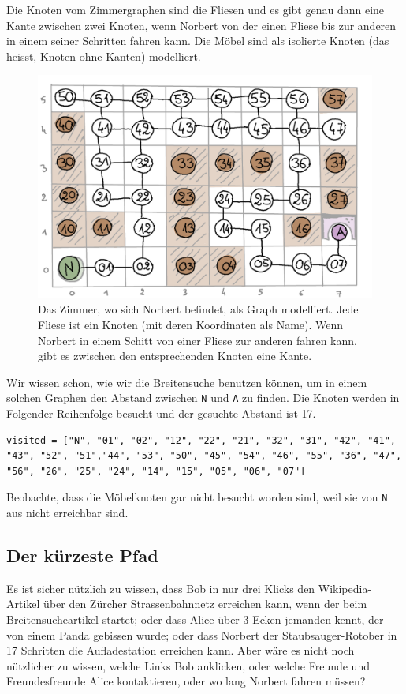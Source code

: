 Die Knoten vom Zimmergraphen sind die Fliesen und es gibt genau dann eine Kante zwischen zwei Knoten, wenn Norbert von der einen Fliese bis zur anderen in einem seiner Schritten fahren kann. Die Möbel sind als isolierte Knoten (das heisst, Knoten ohne Kanten) modelliert.
\begin{figure}[H]
    \centering
    \includegraphics[width=\textwidth]{Pictures/SP/norbert_graph.png}
    \caption{Das Zimmer, wo sich Norbert befindet, als Graph modelliert. Jede Fliese ist ein Knoten (mit deren Koordinaten als Name). Wenn Norbert in einem Schitt von einer Fliese zur anderen fahren kann, gibt es zwischen den entsprechenden Knoten eine Kante.}
    \label{fig:norbert_graph}
\end{figure}
Wir wissen schon, wie wir die Breitensuche benutzen können, um in einem solchen Graphen den Abstand zwischen \texttt{N} und \texttt{A} zu finden.
Die Knoten werden in Folgender Reihenfolge besucht und der gesuchte Abstand ist 17.
\begin{lstlisting}
visited = ["N", "01", "02", "12", "22", "21", "32", "31", "42", "41", "43", "52", "51","44", "53", "50", "45", "54", "46", "55", "36", "47", "56", "26", "25", "24", "14", "15", "05", "06", "07"]
\end{lstlisting}
Beobachte, dass die Möbelknoten gar nicht besucht worden sind, weil sie von \texttt{N} aus nicht erreichbar sind.

\subsection{Der kürzeste Pfad}
Es ist sicher nützlich zu wissen, dass Bob in nur drei Klicks den Wikipedia-Artikel über den Zürcher Strassenbahnnetz erreichen kann, wenn der beim Breitensucheartikel startet; oder dass Alice über 3 Ecken jemanden kennt, der von einem Panda gebissen wurde; oder dass Norbert der Staubsauger-Rotober in 17 Schritten die Aufladestation erreichen kann. Aber wäre es nicht noch nützlicher zu wissen, welche Links Bob anklicken, oder welche Freunde und Freundesfreunde Alice kontaktieren, oder wo lang Norbert fahren müssen?

